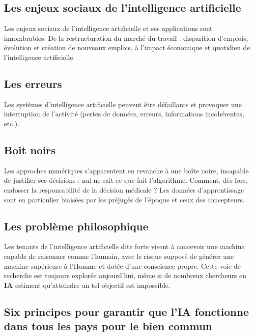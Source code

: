 \begin{titlepage}
	\begin{center}
		\chapter{Les enjeux sociaux de l'intelligence artificielle}
		\minitoc

		\vspace{5cm}
		\pgfspectra[element=He,absorption]
	\end{center}
	\vfill %
\end{titlepage}
\pagestyle{monstyle}\setcounter{page}{6}

Les enjeux sociaux de l'intelligence artificielle et ses
applications sont innombrables. De la restructuration du marché du
travail : disparition d'emplois, évolution et création de nouveaux
emplois, à l'impact économique et quotidien de l'intelligence
artificielle.

\section{Les erreurs}
Les systèmes d'intelligence artificielle peuvent être défaillants et provoquer
une interruption de l'activité (pertes de données, erreurs, informations
incohérentes, etc.).
\section{Boit noirs}
Les approches numériques s'apparentent en revanche à une boîte
noire, incapable de justifier ses décisions : nul ne sait ce que
fait l'algorithme. Comment, dès lors, endosser la responsabilité
de la décision médicale ? Les données d'apprentissage sont en
particulier biaisées par les préjugés de l'époque et ceux des
concepteurs.
\section{Les problème philosophique}
Les tenants de l'intelligence artificielle dite forte visent à
concevoir une machine capable de raisonner comme l'humain, avec le
risque supposé de générer une machine supérieure à l'Homme et dotée
d'une conscience propre. Cette voie de recherche est toujours explorée
aujourd'hui, même si de nombreux chercheurs en \textbf{IA} estiment
qu'atteindre un tel objectif est impossible.

\section{Six principes pour garantir que l'IA fonctionne dans tous les pays pour le bien commun}

